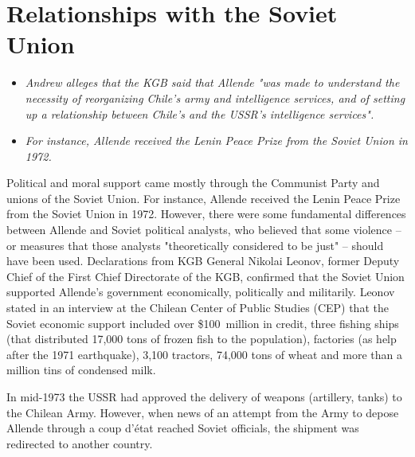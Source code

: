 \section{Relationships with the Soviet
Union}\label{relationships-with-the-soviet-union}

\begin{itemize}
\item
  \emph{Andrew alleges that the KGB said that Allende "was made to
  understand the necessity of reorganizing Chile's army and intelligence
  services, and of setting up a relationship between Chile's and the
  USSR's intelligence services".}
\item
  \emph{For instance, Allende received the Lenin Peace Prize from the
  Soviet Union in 1972.}
\end{itemize}

Political and moral support came mostly through the Communist Party and
unions of the Soviet Union. For instance, Allende received the Lenin
Peace Prize from the Soviet Union in 1972. However, there were some
fundamental differences between Allende and Soviet political analysts,
who believed that some violence -- or measures that those analysts
"theoretically considered to be just" -- should have been used.
Declarations from KGB General Nikolai Leonov, former Deputy Chief of the
First Chief Directorate of the KGB, confirmed that the Soviet Union
supported Allende's government economically, politically and militarily.
Leonov stated in an interview at the Chilean Center of Public Studies
(CEP) that the Soviet economic support included over \$100~million in
credit, three fishing ships (that distributed 17,000 tons of frozen fish
to the population), factories (as help after the 1971 earthquake), 3,100
tractors, 74,000 tons of wheat and more than a million tins of condensed
milk.

In mid-1973 the USSR had approved the delivery of weapons (artillery,
tanks) to the Chilean Army. However, when news of an attempt from the
Army to depose Allende through a coup d'état reached Soviet officials,
the shipment was redirected to another country.

